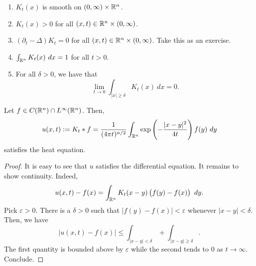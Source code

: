 \begin{enumerate}
    \item $K_t(x)$ is smooth on $(0, \infty)\times\mathbb{R}^n$.
    \item $K_t(x) > 0$ for all $(x,t)\in\mathbb{R}^n\times(0,\infty)$.
    \item $(\partial_t - \Delta)K_t = 0$ for all $(x,t)\in\mathbb{R}^n\times(0,\infty)$. Take this as an exercise.
    \item $\int_{\mathbb{R}^n} K_t(x)~dx = 1$ for all $t > 0$.
    \item For all $\delta > 0$, we have that 
    \begin{equation*}
        \lim_{t\to 0}\int_{|x|\ge\delta}K_t(x)~dx = 0.
    \end{equation*}
\end{enumerate}

\begin{theorem}
    Let $f\in C(\mathbb{R}^n)\cap L^\infty(\mathbb{R}^n)$. Then, 
    \begin{equation*}
        u(x, t) := K_t\ast f = \frac{1}{(4\pi t)^{n/2}}\int_{\mathbb{R}^n}\exp\left(-\frac{|x - y|^2}{4t}\right)f(y)~dy
    \end{equation*}
    satisfies the heat equation.
\end{theorem}
\begin{proof}
    It is easy to see that $u$ satisfies the differential equation. It remains to show continuity. Indeed, 
    \begin{equation*}
        u(x, t) - f(x) = \int_{\mathbb{R}^n} K_t(x - y)\left(f(y) - f(x)\right)~dy.
    \end{equation*}
    Pick $\varepsilon > 0$. There is a $\delta > 0$ such that $|f(y) - f(x)| < \varepsilon$ whenever $|x - y| < \delta$. Then, we have 
    \begin{equation*}
        |u(x, t) - f(x)|\le\int_{|x - y| < \delta} + \int_{|x - y|\ge\delta}.
    \end{equation*}
    The first quantity is bounded above by $\varepsilon$ while the second tends to $0$ as $t\to\infty$. Conclude.
\end{proof}